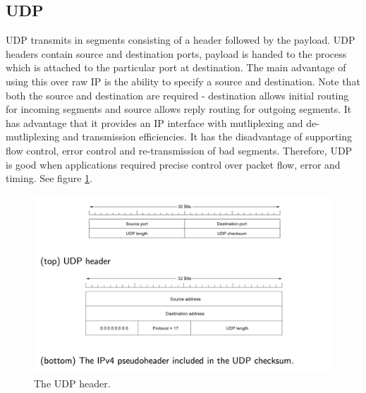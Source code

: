 \documentclass[twoside]{article}
\begin{document}
\subsection{UDP}
UDP transmits in segments consisting of a header followed by the payload. UDP
headers contain source and destination ports, payload is handed to the process
which is attached to the particular port at destination. The main advantage of
using this over raw IP is the ability to specify a source and destination. 
Note that both the source and destination are required - destination allows 
initial routing for incoming segments and source allows reply routing for
outgoing segments. It has advantage that it provides an IP interface with 
mutliplexing and de-mutliplexing and transmission efficiencies. It has the 
disadvantage of supporting flow control, error control and re-transmission of 
bad segments. Therefore, UDP is good when applications required precise 
control over packet flow, error and timing. See figure \ref{fig:udp-header}.
\begin{figure}
  \includegraphics[width=\linewidth]{udp-header.png}
  \caption{The UDP header.}
  \label{fig:udp-header}
\end{figure}
\end{document}

